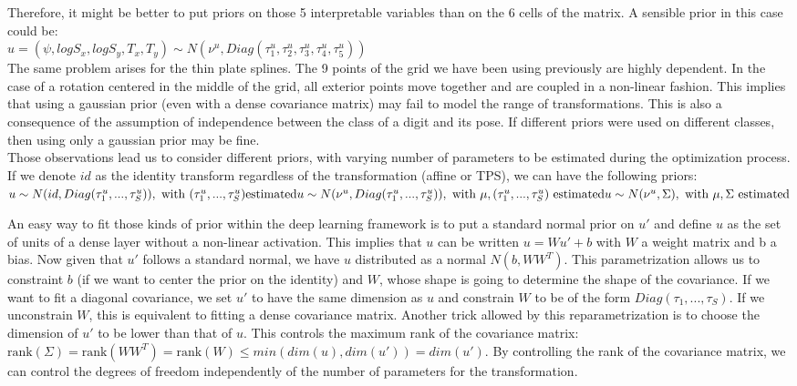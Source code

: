 \documentclass[letterpaper, twoside]{article}
\begin{document}
  Therefore, it might be better to put priors on those 5 interpretable variables than on the 6 cells of the matrix. A sensible prior in this case could be:\\
  $u = (\psi, log S_x, log S_y, T_x, T_y) \sim N(\nu^u, Diag(\tau_1^u, \tau_2^u, \tau_3^u, \tau_4^u, \tau_5^u))$\\

  The same problem arises for the thin plate splines. The 9 points of the grid we have been using previously are highly dependent. In the case of a rotation centered in the middle of the grid, all exterior points move together and are coupled in a non-linear fashion. This implies that using a gaussian prior (even with a dense covariance matrix) may fail to model the range of transformations. This is also a consequence of the assumption of independence between the class of a digit and its pose. If different priors were used on different classes, then using only a gaussian prior may be fine.\\

Those observations lead us to consider different priors, with varying number of parameters to be estimated during the optimization process. If we denote $id$ as the identity transform regardless of the transformation (affine or TPS), we can have the following priors:\\
$
u \sim N(id, Diag(\tau_1^u, ..., \tau_S^u)), \text{ with } (\tau_1^u, ..., \tau_S^u) \text{estimated} \\
u \sim N(\nu^u, Diag(\tau_1^u, ..., \tau_S^u)), \text{ with } \mu, (\tau_1^u, ..., \tau_S^u) \text{ estimated} \\
u \sim N(\nu^u, \Sigma), \text{ with } \mu, \Sigma \text{ estimated}\\
$

An easy way to fit those kinds of prior within the deep learning framework is to put a standard normal prior on $u'$ and define $u$ as the set of units of a dense layer without a non-linear activation. This implies that $u$ can be written $u = W u' + b$ with $W$ a weight matrix and b a bias. Now given that $u'$ follows a standard normal, we have $u$ distributed as a normal $N(b, WW^T)$. This parametrization allows us to constraint $b$ (if we want to center the prior on the identity) and $W$, whose shape is going to determine the shape of the covariance. If we want to fit a diagonal covariance, we set $u'$ to have the same dimension as $u$ and constrain $W$ to be of the form $Diag(\tau_1, ..., \tau_S)$. If we unconstrain $W$, this is equivalent to fitting a dense covariance matrix. Another trick allowed by this reparametrization is to choose the dimension of $u'$ to be lower than that of $u$. This controls the maximum rank of the covariance matrix: $\text{rank}(\Sigma) = \text{rank}(WW^T) = \text{rank}(W) \leq min(dim(u), dim(u')) = dim(u') $. By controlling the rank of the covariance matrix, we can control the degrees of freedom independently of the number of parameters for the transformation.\\
\end{document}
